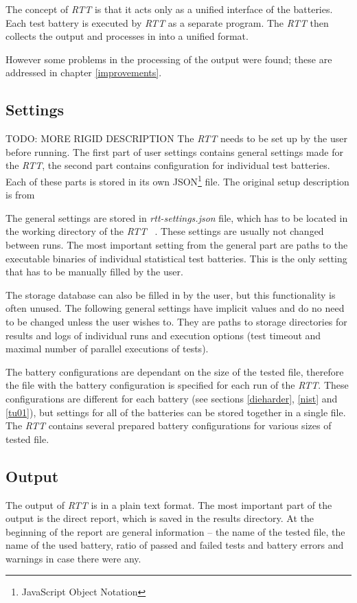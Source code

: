 \documentclass[
  digital,     %
  oneside,     %
  nosansbold,  %
  nocolorbold, %
  nolof,         %
  nolot,         %
]{fithesis4}
\begin{document}
The concept of \emph{RTT} is that it acts only as a unified interface of the batteries. Each test battery is executed by \emph{RTT} as a separate program. The \emph{RTT} then collects the output and processes in into a unified format.~\cite[p.~8]{rtt-obratil}

However some problems in the processing of the output were found; these are addressed in chapter \ref{improvements}.

\subsection{Settings}\label{rtt-settings} 
TODO: MORE RIGID DESCRIPTION
The \emph{RTT} needs to be set up by the user before running. The first part of user settings contains general settings made for the \emph{RTT}, the second part contains configuration for individual test batteries. Each of these parts is stored in its own JSON\footnote{JavaScript Object Notation} file. The original setup description is from

The general settings are stored in \emph{rtt-settings.json} file, which has to be located in the working directory of the \emph{RTT}~\cite[p.~10]{rtt-obratil} . These settings are usually not changed between runs.
The most important setting from the general part are paths to the executable binaries of individual statistical test batteries. This is the only setting that has to be manually filled by the user.

The storage database can also be filled in by the user, but this functionality is often unused. The following general settings have implicit values and do no need to be changed unless the user wishes to. They are paths to storage directories for results and logs of individual runs and execution options (test timeout and maximal number of parallel executions of tests). 

 The battery configurations are dependant on the size of the tested file, therefore the file with the battery configuration is specified for each run of the \emph{RTT}. These configurations are different for each battery (see sections \ref{dieharder}, \ref{nist} and \ref{tu01}), but settings for all of the batteries can be stored together in a single file.~\cite[p.~11]{rtt-obratil}  The \emph{RTT} contains several prepared battery configurations for various sizes of tested file.



\subsection{Output}
The output of \emph{RTT} is in a plain text format. The most important part of the output is the direct report, which is saved in the results directory. At the beginning of the report are general information -- the name of the tested file, the name of the used battery, ratio of passed and failed tests and battery errors and warnings in case there were any.
\end{document}
